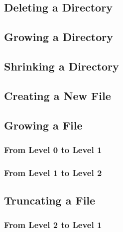 
\subsection{Deleting a Directory}


\subsection{Growing a Directory}


\subsection{Shrinking a Directory}


\subsection{Creating a New File}


\subsection{Growing a File}


\subsubsection{From Level 0 to Level 1}


\subsubsection{From Level 1 to Level 2}


\subsection{Truncating a File}


\subsubsection{From Level 2 to Level 1}

